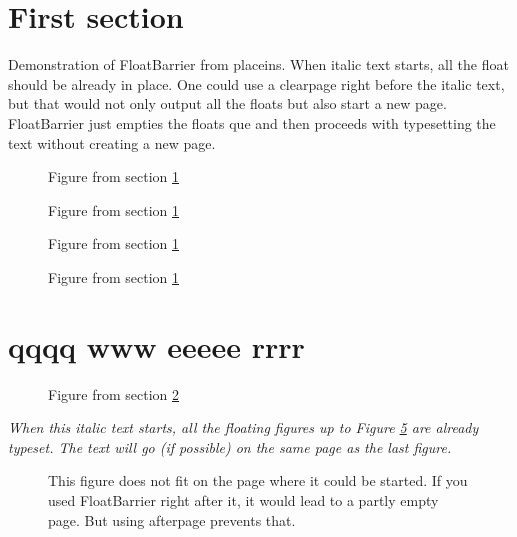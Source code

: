 \documentclass[12pt]{article}
\providecommand\FloatBarrier{}
\newcommand\fakepic[2]{\framebox[#1cm]{\rule{0pt}{#2cm}\small #1$\times$#2 cm$^2$}}
\begin{document}
\section{First section}\label{sec:1}

Demonstration of FloatBarrier from placeins. When italic text starts,
all the float should be already in place. One could use a clearpage
right before the italic text, but that would not only output
all the floats but also start a new page. FloatBarrier just empties
the floats que and then proceeds with typesetting the text without
creating a new page. 


\lipsum[1]

\begin{figure}
\centering
\fakepic{5}{1}
\caption{Figure from section \ref{sec:1}}\label{fig:1}
\end{figure}


\lipsum[1]

\begin{figure}
\centering
\fakepic{5}{6}
\caption{Figure from section \ref{sec:1}}\label{fig:2}
\end{figure}

\begin{figure}
\centering
\fakepic{5}{6}
\caption{Figure from section \ref{sec:1}}\label{fig:3}
\end{figure}

\begin{figure}[b]
\centering
\fakepic{5}{6}
\caption{Figure from section \ref{sec:1}}\label{fig:4}
\end{figure}

\section{qqqq www eeeee rrrr}\label{sec:2}

\lipsum[1]

\begin{figure}
\centering
\fakepic{5}{6}
\caption{Figure from section \ref{sec:2}}\label{fig:5}
\end{figure}

\FloatBarrier
{\itshape
When this italic text starts, all the floating figures 
up to Figure \ref{fig:5} are already 
typeset. The text will go (if possible) on the same page as the last 
figure.}

\begin{figure}
\centering
\fakepic{5}{6}
\caption{This figure does not fit on the page where it could be started. 
If you used FloatBarrier right after it, it would lead to a partly
empty page. But using afterpage prevents that.}\label{fig:6}
\end{figure}

\afterpage{\FloatBarrier}

\lipsum[1-2]
\end{document}
